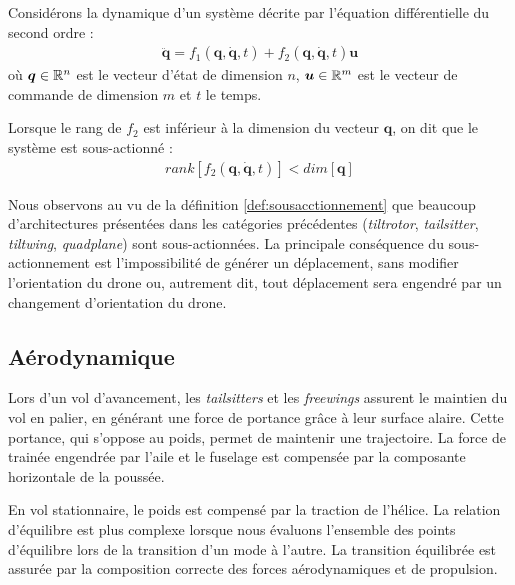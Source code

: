     \begin{definition}
        \label{def:sousacctionnement}
        Considérons la dynamique d'un système décrite par l'équation différentielle du second ordre :
        \begin{align*}
            \ddot{\boldsymbol{q}} = f_1(\boldsymbol{q}, \dot{\boldsymbol{q}}, t) + f_2(\boldsymbol{q}, \dot{\boldsymbol{q}}, t) \boldsymbol{u}
        \end{align*}
        où $\boldsymbol{q} \in {\mathbb R}^{n}$ est le vecteur d'état de dimension $n$, $\boldsymbol{u} \in {\mathbb R}^{m}$ est le vecteur de commande de dimension $m$ et $t$ le temps. 

        Lorsque le rang de $f_2$ est inférieur à la dimension du vecteur $\boldsymbol{q}$, on dit que le système est sous-actionné :
        \begin{align*}
            rank[f_2(\boldsymbol{q}, \dot{\boldsymbol{q}}, t)] < dim[\boldsymbol{q}]
        \end{align*}
    \end{definition}

    Nous observons au vu de la définition \ref{def:sousacctionnement} que beaucoup d'architectures présentées dans les catégories précédentes (\textit{tiltrotor}, \textit{tailsitter}, \textit{tiltwing}, \textit{quadplane}) sont sous-actionnées. La principale conséquence du sous-actionnement est l'impossibilité de générer un déplacement, sans modifier l'orientation du drone ou, autrement dit, tout déplacement sera engendré par un changement d'orientation du drone.
    

    \subsection{Aérodynamique}

    Lors d'un vol d'avancement, les \textit{tailsitters} et les \textit{freewings} assurent le maintien du vol en palier, en générant une force de portance grâce à leur surface alaire. Cette portance, qui s'oppose au poids, permet de maintenir une trajectoire. La force de trainée engendrée par l'aile et le fuselage est compensée par la composante horizontale de la poussée. 
    
    En vol stationnaire, le poids est compensé par la traction de l'hélice. La relation d'équilibre est plus complexe lorsque nous évaluons l'ensemble des points d'équilibre lors de la transition d'un mode à l'autre. La transition équilibrée est assurée par la composition correcte des forces aérodynamiques et de propulsion.

